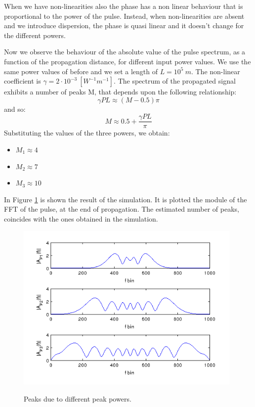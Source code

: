 \documentclass[a4paper,10pt]{report}
\begin{document}
When we have non-linearities also the phase has a non linear behaviour that is proportional to the power of the pulse.
Instead, when non-linearities are absent and we introduce dispersion, the phase is quasi linear and it doesn't change for the different powers.

\newpage
Now we observe the behaviour of the absolute value of the pulse spectrum, as a function of the propagation distance, for different input power values.
We use the same power values of before and we set a length of $L=10^5\ m$. The non-linear coefficient is $\gamma = 2\cdot 10^{-3} \ [W^{-1}m^{-1}]$.
The spectrum of the propagated signal exhibits a number of peaks M, that depends upon the following relationship: $$\gamma P L \approx (M-0.5)\pi$$
and so:$$M \approx 0.5 + \frac{\gamma P L}{\pi}$$
Substituting the values of the three powers, we obtain:
\begin{itemize}
 \item $M_1 \approx 4$
 \item $M_2 \approx 7$
 \item $M_3 \approx 10$
\end{itemize}


In Figure \ref{powers} is shown the result of the simulation. It is plotted the module of the FFT of the pulse, at the end of propagation.
The estimated number of peaks, coincides with the ones obtained in the simulation.
\begin{figure}[!ht]
  \centering
  \includegraphics[width=11cm]{es4_powers.png}\\
  \caption{Peaks due to different peak powers.}
  \label{powers}
\end{figure}


\end{document}
